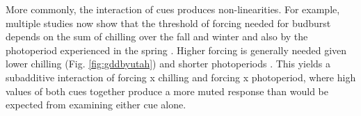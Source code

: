 \documentclass[11pt,letter]{article}
\begin{document}
More commonly, the interaction of cues produces non-linearities. For example, multiple studies now show that the threshold of forcing needed for budburst depends on the sum of chilling over the fall and winter and also by the photoperiod experienced in the spring \citep[e.g.,][]{zohner2014,flynn2018}. Higher forcing is generally needed given lower chilling (Fig. \ref{fig:gddbyutah}) and shorter photoperiods \citep{Basler:2014aa,fu2019}. This yields a subadditive interaction of forcing x chilling and forcing x photoperiod, where high values of both cues together produce a more muted response than would be expected from examining either cue alone. \\ %

\end{document}
